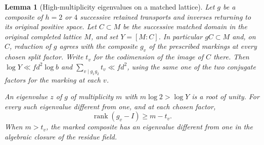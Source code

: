 \documentclass[a4paper,11pt]{article}
\newtheorem{lemma}[proposition]{Lemma}
\theoremstyle{definition}
\theoremstyle{remark}
\numberwithin{equation}{section}
\begin{document}
\begin{lemma}[High-multiplicity eigenvalues on a matched lattice]
\leavevmode\label{lem:torsioneigen636}
Let \(g\) be a composite of \(h=2\) or \(4\) successive retained
transports and inverses returning to its original positive space.
Let \(C\subset M\) be the successive matched domain in the original
completed lattice \(M\), and set \(Y=[M:C]\). In particular \(gC\subset M\)
and, on \(C\), reduction of \(g\) agrees with the composite \(g_v\)
of the prescribed markings at every chosen split factor. Write
\(t_v\) for the codimension of the image of \(C\) there.
Then \(\log Y\ll f d^2\log b\) and
\(\sum_{v\mid g_1g_2}t_v\ll f d^2\), using the same one of the
two conjugate factors for the marking at each \(v\).

An eigenvalue \(z\) of \(g\) of multiplicity \(m\) with
\(m\log2>\log Y\) is a root of unity. For every such eigenvalue
different from one, and at each chosen factor,
\[
                    \operatorname{rank}(g_v-I)\ge m-t_v .
\]
When \(m>t_v\), the marked composite has an eigenvalue different
from one in the algebraic closure of the residue field.
\end{lemma}
\end{document}
